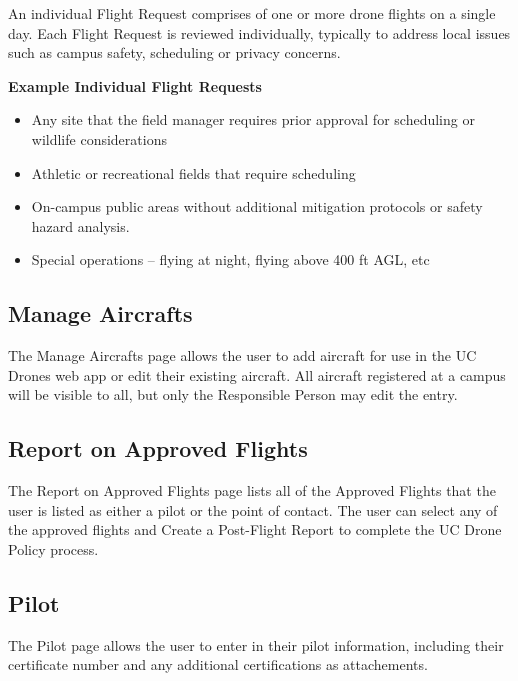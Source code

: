 \documentclass[
  12pt,
]{book}
\providecommand{\tightlist}{%
  \setlength{\itemsep}{0pt}\setlength{\parskip}{0pt}}
\begin{document}
An individual Flight Request comprises of one or more drone flights on a single day. Each Flight Request is reviewed individually, typically to address local issues such as campus safety, scheduling or privacy concerns.

\textbf{Example Individual Flight Requests}

\begin{itemize}
\tightlist
\item
  Any site that the field manager requires prior approval for scheduling or wildlife considerations
\item
  Athletic or recreational fields that require scheduling
\item
  On-campus public areas without additional mitigation protocols or safety hazard analysis.
\item
  Special operations -- flying at night, flying above 400 ft AGL, etc
\end{itemize}

\hypertarget{manage-aircrafts}{%
\subsection{Manage Aircrafts}\label{manage-aircrafts}}

The Manage Aircrafts page allows the user to add aircraft for use in the UC Drones web app or edit their existing aircraft. All aircraft registered at a campus will be visible to all, but only the Responsible Person may edit the entry.

\hypertarget{report-on-approved-flights}{%
\subsection{Report on Approved Flights}\label{report-on-approved-flights}}

The Report on Approved Flights page lists all of the Approved Flights that the user is listed as either a pilot or the point of contact. The user can select any of the approved flights and Create a Post-Flight Report to complete the UC Drone Policy process.

\hypertarget{UCDrones-pilot}{%
\subsection{Pilot}\label{UCDrones-pilot}}

The Pilot page allows the user to enter in their pilot information, including their certificate number and any additional certifications as attachements.
\end{document}
